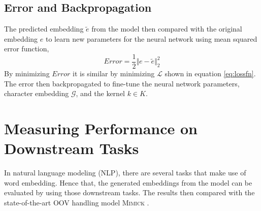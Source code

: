     \subsection{Error and Backpropagation}
        The predicted embedding $\tilde{e}$ from the model then
        compared with the original embedding $e$ to learn new
        parameters for the neural network using mean squared error
        function,
        \begin{equation}
            \label{eq:errorf}
            Error = \frac{1}{2} \Vert e - \tilde{e} \Vert ^{2}_2
        \end{equation}
        By minimizing $Error$ it is similar by minimizing
        $\mathcal{L}$ shown in equation \ref{eq:lossfn}. The error
        then backpropagated to fine-tune the neural network
        parameters, character embedding $\mathcal{G}$, and the kernel
        $k \in K$.
        
\section{Measuring Performance on Downstream Tasks}
    In natural language modeling (NLP), there are several tasks that
    make use of word embedding. Hence that, the generated embeddings
    from the model can be evaluated by using those downstream tasks.
    The results then compared with the state-of-the-art OOV handling
    model \textsc{Mimick} \citep{mimicking2017Pinter}.
    
